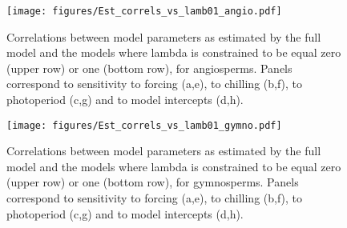 \documentclass{article}\usepackage[]{graphicx}\usepackage[]{color}
\begin{document}
\begin{figure} [H]
  \begin{center}
  \texttt{[image: figures/Est\_correls\_vs\_lamb01\_angio.pdf]}
  \caption{Correlations between model parameters as estimated by the full model and the models where lambda is constrained to be equal zero (upper row) or one (bottom row), for angiosperms. Panels correspond to sensitivity to forcing (a,e), to chilling (b,f), to photoperiod (c,g) and to model intercepts (d,h).}
  \label{fig:correls_angio}
  \end{center}
\end{figure}

\begin{figure} [H]
  \begin{center}
  \texttt{[image: figures/Est\_correls\_vs\_lamb01\_gymno.pdf]}
  \caption{Correlations between model parameters as estimated by the full model and the models where lambda is constrained to be equal zero (upper row) or one (bottom row), for gymnosperms. Panels correspond to sensitivity to forcing (a,e), to chilling (b,f), to photoperiod (c,g) and to model intercepts (d,h).}
  \label{fig:correls_gymno}
  \end{center}
\end{figure}
\end{document}

